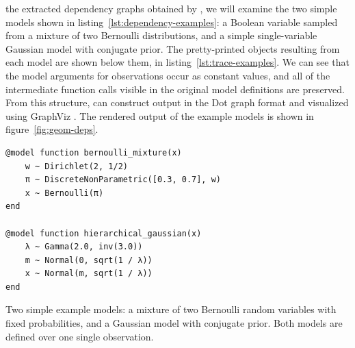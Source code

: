  the extracted dependency graphs obtained by \autogibbsjl{}, we will
examine the two simple models shown in listing~\ref{lst:dependency-examples}: a Boolean variable
sampled from a mixture of two Bernoulli distributions, and a simple single-variable Gaussian model
with conjugate prior.  The pretty-printed  objects resulting from each model are shown
below them, in listing~\ref{lst:trace-examples}.  We can see that the model arguments for
observations occur as constant values, and all of the intermediate function calls visible in the
original model definitions are preserved.  From this structure, \autogibbsjl{} can construct output
in the Dot graph format and visualized using GraphViz \parencite{gansner2000open}.  The rendered
output of the example models is shown in figure~\ref{fig:geom-deps}.

\begin{lstfloat}[p]
\begin{lstlisting}[style=lstfloat]
@model function bernoulli_mixture(x)
    w ~ Dirichlet(2, 1/2)
    π ~ DiscreteNonParametric([0.3, 0.7], w)
    x ~ Bernoulli(π)
end

@model function hierarchical_gaussian(x)
    λ ~ Gamma(2.0, inv(3.0))
    m ~ Normal(0, sqrt(1 / λ))
    x ~ Normal(m, sqrt(1 / λ))
end
\end{lstlisting}
  \caption{Two simple example models: a mixture of two Bernoulli random variables with fixed
    probabilities, and a Gaussian model with conjugate prior.  Both models are defined over one
    single observation.}
  \label{lst:dependency-examples}
\end{lstfloat}

